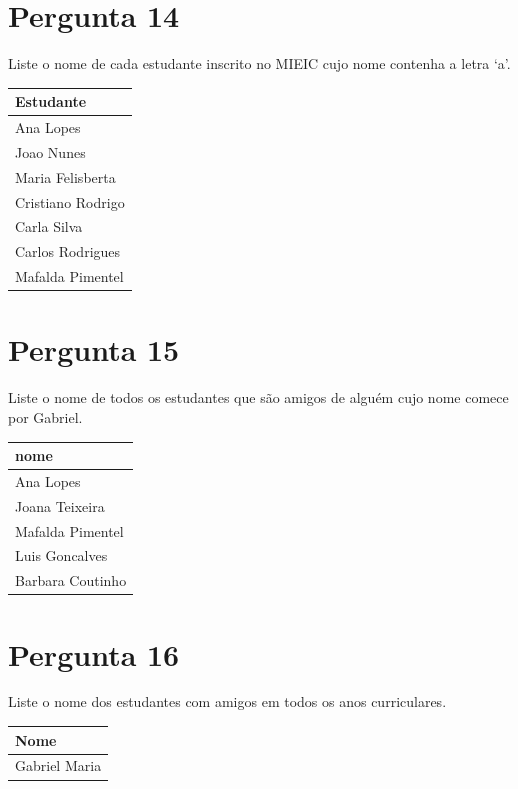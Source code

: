 \documentclass[type=recurso, year=2015/16]{bdad_exam}
\begin{document}
{\section{Pergunta 14}
Liste o nome de cada estudante inscrito no MIEIC cujo nome contenha a letra `a'.
\begin{center} \begin{tabular}{l}
    \textbf{Estudante} \\ \hline
    Ana Lopes          \\
    Joao Nunes         \\
    Maria Felisberta   \\
    Cristiano Rodrigo  \\
    Carla Silva        \\
    Carlos Rodrigues   \\
    Mafalda Pimentel   
\end{tabular} \end{center}


\section{Pergunta 15}
Liste o nome de todos os estudantes que são amigos de alguém cujo nome comece por Gabriel.
\begin{center} \begin{tabular}{l}
    \textbf{nome}    \\ \hline
    Ana Lopes        \\
    Joana Teixeira   \\
    Mafalda Pimentel \\
    Luis Goncalves   \\
    Barbara Coutinho
\end{tabular} \end{center}


\section{Pergunta 16}
Liste o nome dos estudantes com amigos em todos os anos curriculares.
\begin{center} \begin{tabular}{l}
    \textbf{Nome}    \\ \hline
    Gabriel Maria
\end{tabular} \end{center}


}
\end{document}
